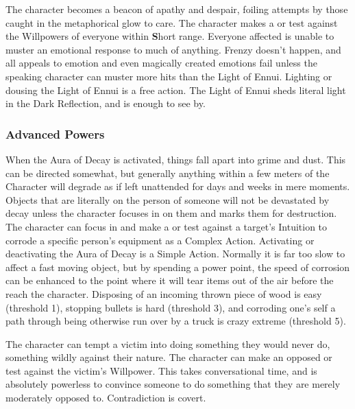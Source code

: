  The character becomes a beacon of apathy and despair, foiling attempts by those caught in the metaphorical glow to care. The character makes a  or  test against the Willpowers of everyone within \textbf{S}hort range. Everyone affected is unable to muster an emotional response to much of anything. Frenzy doesn't happen, and all appeals to emotion and even magically created emotions fail unless the speaking character can muster more hits than the Light of Ennui. Lighting or dousing the Light of Ennui is a free action. The Light of Ennui sheds literal light in the Dark Reflection, and is enough to see by.

\subsubsection{Advanced Powers}

 When the Aura of Decay is activated, things fall apart into grime and dust. This can be directed somewhat, but generally anything within a few meters of the Character will degrade as if left unattended for days and weeks in mere moments. Objects that are literally on the person of someone will not be devastated by decay unless the character focuses in on them and marks them for destruction. The character can focus in and make a  or  test against a target's Intuition to corrode a specific person's equipment as a Complex Action. Activating or deactivating the Aura of Decay is a Simple Action. Normally it is far too slow to affect a fast moving object, but by spending a power point, the speed of corrosion can be enhanced to the point where it will tear items out of the air before the reach the character. Disposing of an incoming thrown piece of wood is easy (threshold 1), stopping bullets is hard (threshold 3), and corroding one's self a path through  being otherwise run over by a truck is crazy extreme (threshold 5).

 The character can tempt a victim into doing something they would never do, something wildly against their nature. The character can make an opposed  or  test against the victim's Willpower. This takes conversational time, and is absolutely powerless to convince someone to do something that they are merely moderately opposed to. Contradiction is covert.

